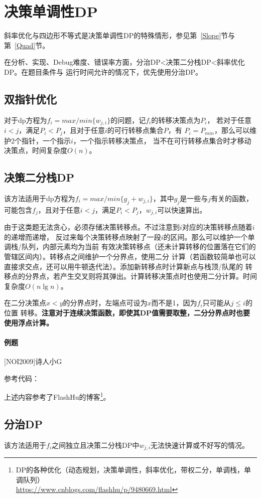 \section{决策单调性DP}
斜率优化与四边形不等式是决策单调性DP的特殊情形，参见第~\ref{Slope}节与
第~\ref{Quad}节。

在分析、实现、Debug难度、错误率方面，分治DP<决策二分栈DP<斜率优化DP。在题目条件与
运行时间允许的情况下，优先使用分治DP。
\subsection{双指针优化}
对于dp方程为$f_i=max/min\{w_{j,i}\}$的问题，记$f_i$的转移决策点为$P_i$，
若对于任意$i<j$，满足$P_i<P_j$，且对于任意$i$的可行转移点集合$P$，有
$P_i=P_{min}$，那么可以维护2个指针，一个指示$i$，一个指示转移决策点，
当不在可行转移点集合时才移动决策点，时间复杂度$O(n)$。
\subsection{决策二分栈DP}
该方法适用于dp方程为$f_i=max/min\{g_j+w_{j,i}\}$，其中$g_j$是一些与$j$有关的函数，
可能包含$f_j$，且对于任意$i<j$，满足$P_i<P_j$，$w_{j,i}$可以快速算出。

由于这类题无法贪心，必须存储决策转移点。不过注意到$i$对应的决策转移点随着$i$的递增而递增，
反过来每个决策转移点映射了一段$i$的区间。那么可以维护一个单调栈/队列，内部元素均为当前
有效决策转移点（还未计算转移的位置落在它们的管辖区间内）。转移点之间维护一个分界点，使用二分
计算（若函数较简单也可以直接求交点，还可以用牛顿迭代法）。添加新转移点时计算新点与栈顶/队尾的
转移点的分界点，若产生交叉则将其弹出。计算转移决策点时也使用二分计算。时间复杂度$O(n\lg n)$。

在二分决策点$x<y$的分界点时，左端点可设为$x$而不是1，因为$f_i$只可能从$j\leq i$的位置
转移。{\bfseries 注意对于连续决策函数，即使其DP值需要取整，二分分界点时也要使用浮点计算。}

\paragraph{例题} [NOI2009]诗人小G

参考代码：


上述内容参考了FlashHu的博客\footnote{
    DP的各种优化（动态规划，决策单调性，斜率优化，带权二分，单调栈，单调队列）\\
    \url{https://www.cnblogs.com/flashhu/p/9480669.html}
}。
\subsection{分治DP}
该方法适用于$f_i$之间独立且决策二分栈DP中$w_{j,i}$无法快速计算或不好写的情况。

